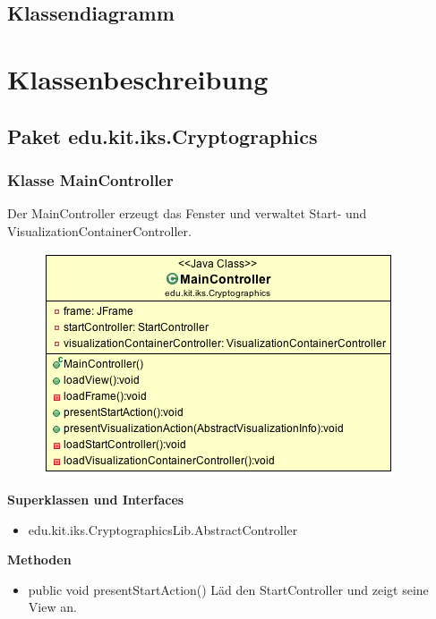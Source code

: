 \documentclass{article}
\begin{document}
\subsection{Klassendiagramm}

\section{Klassenbeschreibung}
  \subsection{Paket edu.kit.iks.Cryptographics}
    \subsubsection{Klasse MainController}
      Der MainController erzeugt das Fenster und verwaltet Start- und VisualizationContainerController.
      \begin{figure}[H]
        \centering
        \includegraphics[width=\textwidth]{resources/edu-kit-iks-Cryptographics-MainController}
      \end{figure}

      \textbf{Superklassen und Interfaces}
      \begin{itemize}
        \item edu.kit.iks.CryptographicsLib.AbstractController
      \end{itemize}
      
      \textbf{Methoden}
      \begin{itemize}
        \item public void presentStartAction() \newline
        Läd den StartController und zeigt seine View an.
      \end{itemize}
\end{document}
